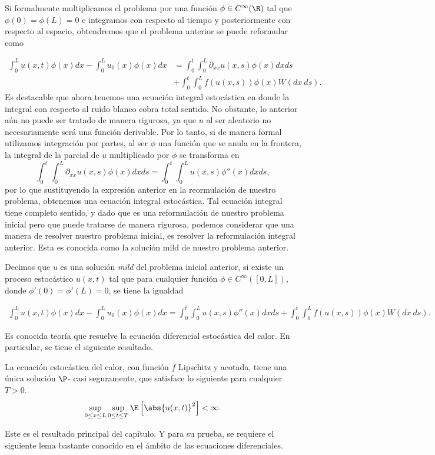 Si formalmente multiplicamos el problema por una función $\phi \in C^{\infty}(\R)$ tal que $\phi(0)=\phi(L)=0$ e integramos con respecto al tiempo y posteriormente con respecto al espacio, obtendremos que el problema anterior se puede reformular como 

\begin{align*}
   \int_{0}^{L}u(x,t)\phi(x)dx-\int_{0}^{L}u_0(x)\phi(x)dx&=\int_0^{t}\int_0^{L}\partial_{xx}u(x,s)\phi(x)dxds\\
   &+\int_{0}^{t}\int_{0}^{L}f(u(x,s))\phi(x)W(dx \ ds).    
   \end{align*}
Es destacable que ahora tenemos una ecuación integral estocástica en donde la integral con respecto al ruido blanco cobra total sentido. No obstante, lo anterior aún no puede ser tratado de manera rigurosa, ya que $u$ al ser aleatorio no necesariamente será una función derivable. Por lo tanto, si de manera formal utilizamos integración por partes, al ser $\phi$ una función que se anula en la frontera, la integral de la parcial de $u$ multiplicado por $\phi$ se transforma en
\[
   \int_{0}^{t}\int_{0}^{L}\partial_{xx}u(x,s)\phi(x)dx ds=\int_{0}^{t}\int_{0}^{L}u(x,s)\phi''(x)dx ds,
\]
por lo que sustituyendo la expresión anterior en la reormulación de nuestro problema, obtenemos una ecuación integral estocástica. Tal ecuación integral tiene completo sentido, y dado que es una reformulación de nuestro problema inicial pero que puede tratarse de manera rigurosa, podemos considerar que una manera de resolver nuestro problema inicial, es resolver la reformulación integral anterior. Esta es conocida como la solución mild de nuestro problema anterior.

\begin{dfn} 
Decimos que $u$ es una solución \textit{mild} del problema inicial anterior, si existe un proceso estocástico $u(x,t)$ tal que para cualquier función $\phi\in C^{\infty}([0,L])$, donde $\phi'(0)=\phi'(L)=0$, se tiene la igualdad 

\begin{align*}
   \int_{0}^{L}u(x,t)\phi(x)dx-\int_{0}^{L}u_0(x)\phi(x)dx=\int_{0}^{t}\int_{0}^{L}u(x,s)\phi''(x)dx ds+\int_{0}^{t}\int_{0}^{L}f(u(x,s))\phi(x)W(dx \ ds).  
\end{align*}
\end{dfn}

Es conocida teoría que resuelve la ecuación diferencial estocástica del calor. En particular, se tiene el siguiente resultado.

\begin{teo} 
La ecuación estocástica del calor, con función $f$ Lipschitz y acotada, tiene una única solución $\P$- casi seguramente, que satisface lo siguiente para cualquier $T>0$.
\[
\sup_{0\leq x\leq L}\sup_{0\leq t \leq T}\E\left[\abs{u(x,t)}^2\right]<\infty.   
\]
\end{teo}
Este es el resultado principal del capítulo. Y para su prueba, se requiere el siguiente lema bastante conocido en el ámbito de las ecuaciones diferenciales.

